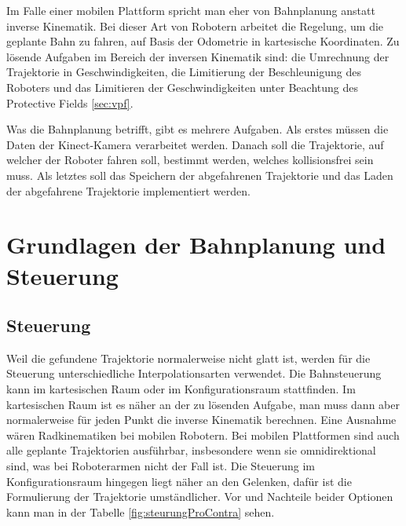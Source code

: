 Im Falle einer mobilen Plattform spricht man eher von Bahnplanung anstatt inverse Kinematik. Bei dieser Art von Robotern arbeitet die Regelung, um die geplante Bahn zu fahren, auf Basis der Odometrie in kartesische Koordinaten. Zu lösende Aufgaben im Bereich der inversen Kinematik sind: die Umrechnung der Trajektorie in Geschwindigkeiten, die Limitierung der Beschleunigung des Roboters und das Limitieren der Geschwindigkeiten unter Beachtung des Protective Fields \ref{sec:vpf}.

Was die Bahnplanung betrifft, gibt es mehrere Aufgaben. Als erstes müssen die Daten der Kinect-Kamera verarbeitet werden. 
Danach soll die Trajektorie, auf welcher der Roboter fahren soll, bestimmt werden, welches kollisionsfrei sein muss. Als letztes soll das 
Speichern der abgefahrenen Trajektorie und das Laden der abgefahrene Trajektorie implementiert werden.



\section{Grundlagen der Bahnplanung und Steuerung}


\subsection{Steuerung}
\label{bahnplanung_steuerung_sec}

Weil die gefundene Trajektorie normalerweise nicht glatt ist, werden für die Steuerung unterschiedliche Interpolationsarten verwendet.
Die Bahnsteuerung kann im kartesischen Raum oder im Konfigurationsraum stattfinden.
Im kartesischen Raum ist es näher an der zu lösenden Aufgabe, man muss dann aber normalerweise für jeden Punkt die inverse Kinematik berechnen. Eine Ausnahme wären Radkinematiken bei mobilen Robotern. Bei mobilen Plattformen sind auch alle geplante Trajektorien ausführbar, insbesondere wenn sie omnidirektional sind, was bei Roboterarmen nicht der Fall ist. 
Die Steuerung im Konfigurationsraum hingegen liegt näher an den Gelenken, dafür ist die Formulierung der Trajektorie umständlicher.
Vor und Nachteile beider Optionen kann man in der Tabelle \ref{fig:steurungProContra} sehen.


